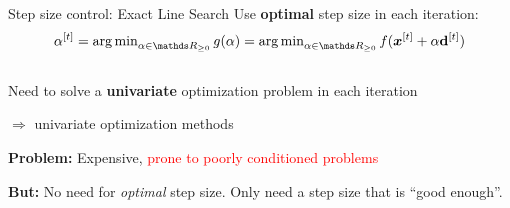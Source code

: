 \documentclass[11pt,compress,t,notes=noshow, xcolor=table]{beamer}
\begin{document}
	\begin{vbframe}{Step size control: Exact Line Search}
		Use \textbf{optimal} step size in each iteration:
		\vspace*{-0.1cm}
		$$ \alpha^{[t]} = \argmin_{\alpha \in \R_{\ge 0}} g(\alpha) = \argmin_{\alpha \in \R_{\ge 0}} f(\bm{x}^{[t]} + \alpha \mathbf{d}^{[t]})$$
		\begin{columns}
			\begin{column}{0.59\textwidth}
				Need to solve a \textbf{univariate} optimization problem in each iteration

                $\Rightarrow$ univariate optimization methods

                \medskip
                
                \textbf{Problem:} Expensive, \textcolor{red}{prone to poorly conditioned problems}

                \medskip

                \textbf{But:} No need for \textit{optimal} step size.
                Only need a step size that is \enquote{good enough}.
                

\end{column}
\end{columns}
\end{vbframe}
\end{document}
